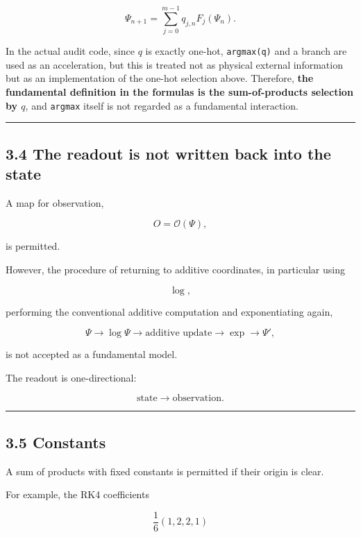 \documentclass[
  a4paper,
]{article}
\begin{document}
\[
\boxed{
\Psi_{n+1}
=
\sum_{j=0}^{m-1} q_{j,n}F_j(\Psi_n).
}
\]

In the actual audit code, since \(q\) is exactly one-hot,
\texttt{argmax(q)} and a branch are used as an acceleration, but this is
treated not as physical external information but as an implementation of
the one-hot selection above. Therefore, \textbf{the fundamental
definition in the formulas is the sum-of-products selection by \(q\)},
and \texttt{argmax} itself is not regarded as a fundamental interaction.

\begin{center}\rule{0.5\linewidth}{0.5pt}\end{center}

\subsection{3.4 The readout is not written back into the
state}\label{the-readout-is-not-written-back-into-the-state}

A map for observation,

\[
O=\mathcal O(\Psi),
\]

is permitted.

However, the procedure of returning to additive coordinates, in
particular using

\[
\log,
\]

performing the conventional additive computation and exponentiating
again,

\[
\Psi
\rightarrow
\log\Psi
\rightarrow
\text{additive update}
\rightarrow
\exp
\rightarrow
\Psi',
\]

is not accepted as a fundamental model.

The readout is one-directional:

\[
\boxed{
\text{state}\rightarrow\text{observation}.
}
\]

\begin{center}\rule{0.5\linewidth}{0.5pt}\end{center}

\subsection{3.5 Constants}\label{constants}

A sum of products with fixed constants is permitted if their origin is
clear.

For example, the RK4 coefficients

\[
\frac16(1,2,2,1)
\]
\end{document}
